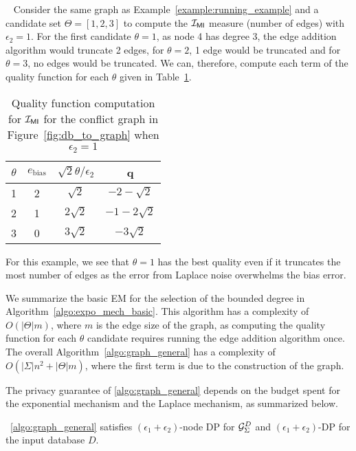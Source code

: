 \begin{example}~\label{example:quality_function}
    Consider the same graph as Example~\ref{example:running_example} and a candidate set $\Theta = [1, 2, 3]$ to compute the $\mathcal{I_{\mathsf{MI}}}$ measure (number of edges) with $\epsilon_2=1$. For the first candidate $\theta = 1$, as node 4 has degree 3, the edge addition algorithm would truncate 2 edges, for $\theta = 2$, 1 edge would be truncated and for $\theta = 3$, no edges would be truncated. We can, therefore, compute each term of the quality function for each $\theta$ given in Table~\ref{tab:example_quality_function}.  
    \begin{table}[]
        \centering
        \begin{tabular}{|c|c|c|c|}
             \hline
             $\theta$ & $e_{\text{bias}}$ & ${\sqrt{2}\theta}/{\epsilon_2}$ & q  \\
             \hline
             1 & 2 & $\sqrt{2}$ & $-2 - \sqrt{2}$\\
             2 & 1 & $2\sqrt{2}$ &  $-1 - 2\sqrt{2}$\\
             3 & 0 & $3\sqrt{2}$ & $-3\sqrt{2}$\\
             \hline
        \end{tabular}
        \caption{Quality function computation for $\mathcal{I_{\mathsf{MI}}}$ for the conflict graph in Figure~\ref{fig:db_to_graph} when $\epsilon_2=1$}
        \label{tab:example_quality_function}
    \end{table}
    For this example, we see that $\theta=1$ has the best quality even if it truncates the most number of edges as the error from Laplace noise overwhelms the bias error.
\end{example}

We summarize the basic EM for the selection of the bounded degree in Algorithm~\ref{algo:expo_mech_basic}.
This algorithm has a complexity of $O(|\Theta|m)$, where $m$ is the edge size of the graph, as computing the quality function for each $\theta$ candidate requires running the edge addition algorithm once. The overall Algorithm~\ref{algo:graph_general} has a complexity of $O(|\Sigma|n^2+|\Theta|m)$, where the first term is due to the construction of the graph.

The privacy guarantee of \cref{algo:graph_general} depends on the budget spent for the exponential mechanism and the Laplace mechanism, as summarized below. 
\begin{theorem}\label{thm:privacy_proof_dc_oblivious}
    ~\cref{algo:graph_general} satisfies $(\epsilon_1 + \epsilon_2)$-node DP for ${\mathcal{G}_{{\Sigma}}^{D}}$ and $(\epsilon_1 + \epsilon_2)$-DP for the input database $D$.
\end{theorem}

